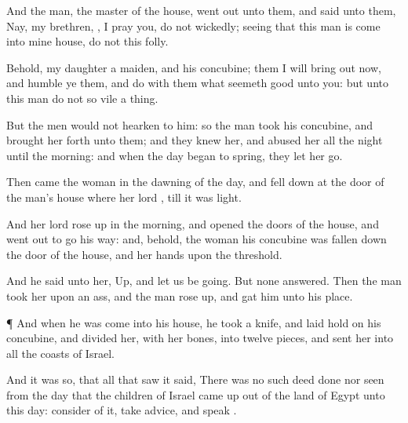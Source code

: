 {And the
man, the
master of the
house, went
out unto them, and
said unto them,
Nay, my
brethren,
{}, I pray you, do not
{}
wickedly;
seeing that this
man is
come into mine
house,
do not this
folly.

Behold,
{} my
daughter a
maiden, and his
concubine; them I will bring
out now, and
humble ye them, and
do with them what
seemeth
good unto you: but unto this
man
do not
so
vile a
thing.

But the
men
would not
hearken to him: so the
man
took his
concubine, and
brought her
forth unto them; and they
knew her, and
abused her all the
night until the
morning: and when the
day began to
spring, they let her
go.

Then
came the
woman in the
dawning of the
day, and fell
down at the
door of the
man’s
house where her
lord
{}, till it was
light.

And her
lord rose
up in the
morning, and
opened the
doors of the
house, and went
out to
go his
way: and, behold, the
woman his
concubine was fallen
down
{} the
door of the
house, and her
hands
{} upon the
threshold.

And he
said unto her,
Up, and let us be
going. But none
answered. Then the
man
took her
{} upon an
ass, and the
man rose
up, and
gat him unto his
place.


\par }{\PP {}¶ And when he was
come into his
house, he
took a
knife, and laid
hold on his
concubine, and
divided her,
{} with her
bones, into
twelve
pieces, and
sent her into all the
coasts of
Israel.

And it was
so, that all that
saw it
said, There was no such
deed done nor
seen from the
day that the
children of
Israel came
up out of the
land of
Egypt unto this
day:
consider of it, take
advice, and
speak
{}.




\par }
